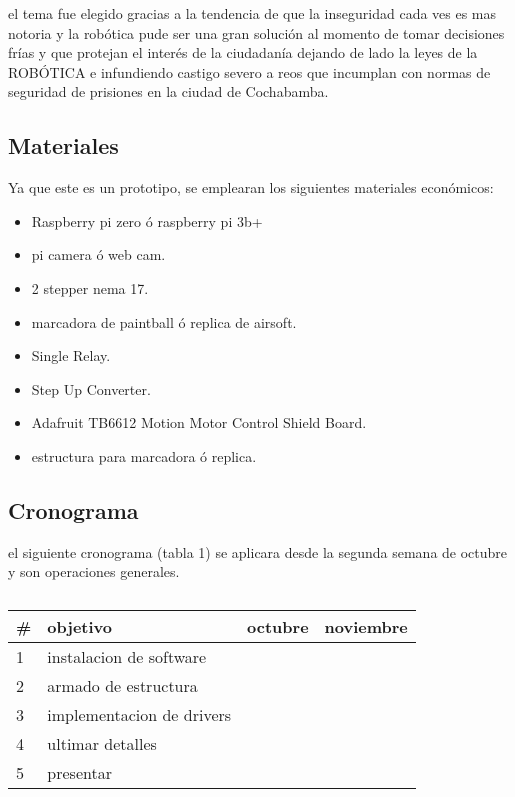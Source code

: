 el tema fue elegido gracias a la tendencia de que la inseguridad cada ves es mas notoria y la robótica pude ser una gran solución al momento de tomar decisiones frías y que protejan el interés de la ciudadanía dejando de lado la leyes de la ROBÓTICA e infundiendo castigo severo a reos que incumplan con normas de seguridad de prisiones en la ciudad de Cochabamba. 

\subsection*{Materiales}
Ya que este es un prototipo, se emplearan los siguientes materiales económicos:
\begin{itemize}
\item Raspberry pi zero ó raspberry pi 3b+
\item pi camera ó web cam.
\item 2 stepper nema 17.
\item marcadora de paintball ó replica de airsoft.
\item Single Relay.
\item Step Up Converter.
\item Adafruit TB6612 Motion Motor Control Shield Board.
\item estructura para marcadora ó replica.

\end{itemize}


\subsection*{Cronograma}
el siguiente cronograma (tabla 1) se aplicara desde la segunda semana de octubre y son operaciones generales.
\begin{table}[]
\centering
\begin{tabular}{|l|l|l|l|l|l|l|l|l|l|}
\hline
\# & objetivo & \multicolumn{4}{l|}{octubre} & \multicolumn{4}{l|}{noviembre} \\ \hline
1 & instalacion de software &  & \cellcolor[HTML]{34FF34} & \cellcolor[HTML]{34FF34} &  &  &  &  &  \\ \hline
2 & armado de estructura &  &  & \cellcolor[HTML]{34FF34} & \cellcolor[HTML]{34FF34} & \cellcolor[HTML]{34FF34} &  &  &  \\ \hline
3 & implementacion de drivers &  &  & \cellcolor[HTML]{34FF34} & \cellcolor[HTML]{34FF34} & \cellcolor[HTML]{34FF34} &  &  &  \\ \hline
4 & ultimar detalles &  &  &  &  &  & \cellcolor[HTML]{34FF34} &  &  \\ \hline
5 & presentar &  &  &  &  &  &  & \cellcolor[HTML]{34FF34} & \cellcolor[HTML]{34FF34} \\ \hline
\end{tabular}
\caption{}
\label{tab:my-table}
\end{table}
